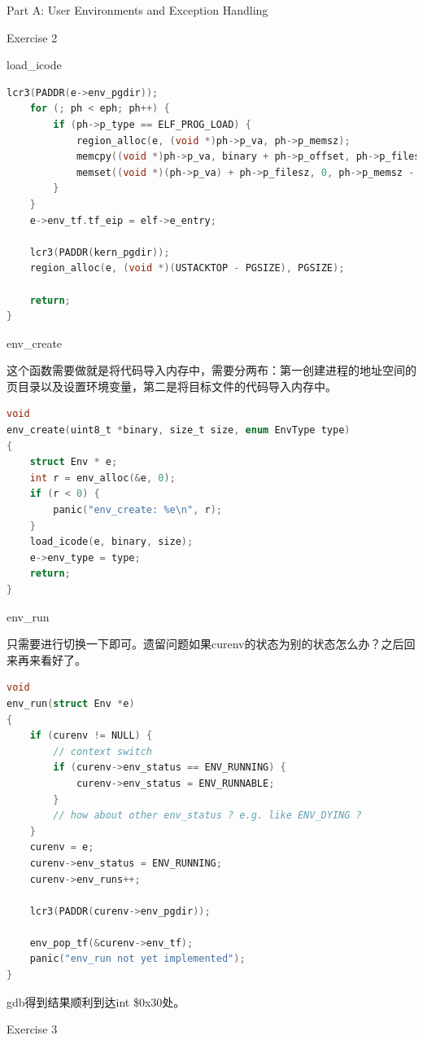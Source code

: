\documentclass[GBK,winfonts,a4paper,10pt]{ctexart}
\begin{document}
\begin{section}{ Part A: User Environments and Exception Handling }
\begin{subsection}{ Exercise 2 }
\begin{subsubsection}{load\_icode}
\begin{lstlisting}[language=C]
    lcr3(PADDR(e->env_pgdir));
    for (; ph < eph; ph++) {
        if (ph->p_type == ELF_PROG_LOAD) {
            region_alloc(e, (void *)ph->p_va, ph->p_memsz);
            memcpy((void *)ph->p_va, binary + ph->p_offset, ph->p_filesz);
            memset((void *)(ph->p_va) + ph->p_filesz, 0, ph->p_memsz - ph->p_filesz);
        }
    }
    e->env_tf.tf_eip = elf->e_entry;

    lcr3(PADDR(kern_pgdir));
    region_alloc(e, (void *)(USTACKTOP - PGSIZE), PGSIZE);

    return;
}
\end{lstlisting}
\end{subsubsection}


\begin{subsubsection}{env\_create}
\par
这个函数需要做就是将代码导入内存中，需要分两布：第一创建进程的地址空间的页目录以及设置环境变量，第二是将目标文件的代码导入内存中。
\begin{lstlisting}[language=C]
void
env_create(uint8_t *binary, size_t size, enum EnvType type)
{
    struct Env * e;
    int r = env_alloc(&e, 0);
    if (r < 0) {
        panic("env_create: %e\n", r);
    }
    load_icode(e, binary, size);
    e->env_type = type;
    return;
}
\end{lstlisting}
\end{subsubsection}

\begin{subsubsection}{env\_run}
\par
只需要进行切换一下即可。遗留问题如果curenv的状态为别的状态怎么办？之后回来再来看好了。
\begin{lstlisting}[language=C]
void
env_run(struct Env *e)
{
    if (curenv != NULL) {
        // context switch
        if (curenv->env_status == ENV_RUNNING) {
            curenv->env_status = ENV_RUNNABLE;
        }
        // how about other env_status ? e.g. like ENV_DYING ?
    }
    curenv = e;
    curenv->env_status = ENV_RUNNING;
    curenv->env_runs++;
    
    lcr3(PADDR(curenv->env_pgdir));

    env_pop_tf(&curenv->env_tf);    
	panic("env_run not yet implemented");
}
\end{lstlisting}
\end{subsubsection}

\par
gdb得到结果顺利到达int \$0x30处。
\end{subsection}

\begin{subsection}{ Exercise 3 }
\end{subsection}


\end{section}
\end{document}
